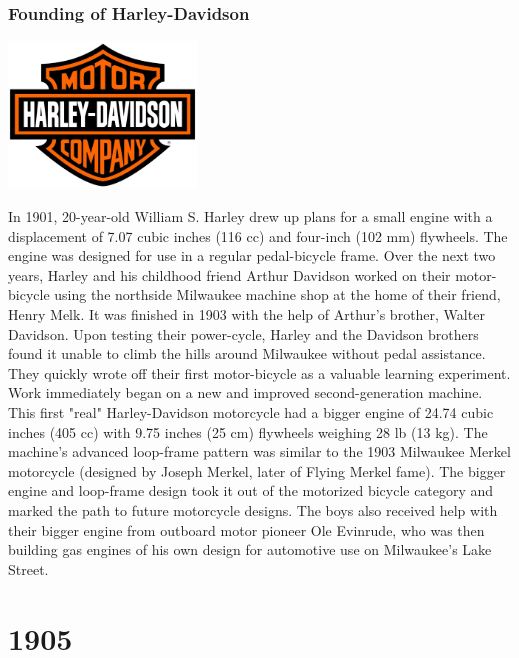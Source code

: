 \documentclass[11pt]{report}
\begin{document}
\subsection{Founding of Harley-Davidson}
\vspace{2mm}\begin{center}\includegraphics[width=5cm]{./img/harleyDavidsonLogo.jpg}\end{center}
In 1901, 20-year-old William S. Harley drew up plans for a small engine with a displacement of 7.07 cubic inches (116 cc) and four-inch (102 mm) flywheels. The engine was designed for use in a regular pedal-bicycle frame. Over the next two years, Harley and his childhood friend Arthur Davidson worked on their motor-bicycle using the northside Milwaukee machine shop at the home of their friend, Henry Melk. It was finished in 1903 with the help of Arthur's brother, Walter Davidson. Upon testing their power-cycle, Harley and the Davidson brothers found it unable to climb the hills around Milwaukee without pedal assistance. They quickly wrote off their first motor-bicycle as a valuable learning experiment.\\ \indent Work immediately began on a new and improved second-generation machine. This first "real" Harley-Davidson motorcycle had a bigger engine of 24.74 cubic inches (405 cc) with 9.75 inches (25 cm) flywheels weighing 28 lb (13 kg). The machine's advanced loop-frame pattern was similar to the 1903 Milwaukee Merkel motorcycle (designed by Joseph Merkel, later of Flying Merkel fame). The bigger engine and loop-frame design took it out of the motorized bicycle category and marked the path to future motorcycle designs. The boys also received help with their bigger engine from outboard motor pioneer Ole Evinrude, who was then building gas engines of his own design for automotive use on Milwaukee's Lake Street.

\chapter{1905}
\section{}
\end{document}
